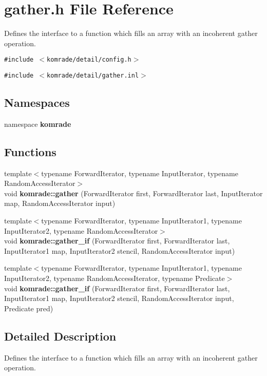 \section{gather.h File Reference}
\label{gather_8h}
Defines the interface to a function which fills an array with an incoherent gather operation. 

{\tt \#include $<$komrade/detail/config.h$>$}\par
{\tt \#include $<$komrade/detail/gather.inl$>$}\par
\subsection*{Namespaces}
\begin{CompactItemize}
\item 
namespace {\bf komrade}
\end{CompactItemize}
\subsection*{Functions}
\begin{CompactItemize}
\item 
{\footnotesize template$<$typename ForwardIterator, typename InputIterator, typename RandomAccessIterator$>$ }\\void {\bf komrade::gather} (ForwardIterator first, ForwardIterator last, InputIterator map, RandomAccessIterator input)
\item 
{\footnotesize template$<$typename ForwardIterator, typename InputIterator1, typename InputIterator2, typename RandomAccessIterator$>$ }\\void {\bf komrade::gather\_\-if} (ForwardIterator first, ForwardIterator last, InputIterator1 map, InputIterator2 stencil, RandomAccessIterator input)
\item 
{\footnotesize template$<$typename ForwardIterator, typename InputIterator1, typename InputIterator2, typename RandomAccessIterator, typename Predicate$>$ }\\void {\bf komrade::gather\_\-if} (ForwardIterator first, ForwardIterator last, InputIterator1 map, InputIterator2 stencil, RandomAccessIterator input, Predicate pred)
\end{CompactItemize}


\subsection{Detailed Description}
Defines the interface to a function which fills an array with an incoherent gather operation. 

